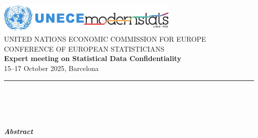 
\setcounter{page}{1}
\thispagestyle{empty} \vspace*{-2.0cm} %
\includegraphics[height=1.5cm]{UNECE_logo}\hspace*{8cm}\includegraphics[height=1.5cm]{ModernStatsLogo}\\[\baselineskip]
\textsc{UNITED NATIONS ECONOMIC COMMISSION FOR EUROPE} \vspace*{2mm}\\
\textsc{CONFERENCE OF EUROPEAN STATISTICIANS}\vspace*{2mm}\\
\textbf{Expert meeting on Statistical Data Confidentiality}\vspace*{2mm}\\
15--17 October 2025, Barcelona              %
\vspace*{-1mm}
{\color{unece_color} \par\noindent\rule{\textwidth}{1.25pt}}\\[1cm]
{\LARGE \TITLE}\vspace*{-2mm}\\ %
\AUTHOR\ %
\ORGANISATION\vspace{2mm}\\ %
\EMAIL\vspace*{1cm}\\ %
\noindent
{\large\textbf{\textit{Abstract}}}\\ %
\ABSTRACT
\newpage

